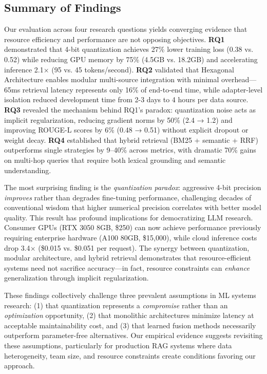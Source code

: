 \documentclass[pdflatex,sn-basic]{sn-jnl}
\begin{document}
\subsection{Summary of Findings}
\label{sec:results-summary}

Our evaluation across four research questions yields converging evidence that resource efficiency and performance are not opposing objectives. \textbf{RQ1} demonstrated that 4-bit quantization achieves 27\% lower training loss (0.38 vs. 0.52) while reducing GPU memory by 75\% (4.5GB vs. 18.2GB) and accelerating inference 2.1$\times$ (95 vs. 45 tokens/second). \textbf{RQ2} validated that Hexagonal Architecture enables modular multi-source integration with minimal overhead—65ms retrieval latency represents only 16\% of end-to-end time, while adapter-level isolation reduced development time from 2-3 days to 4 hours per data source. \textbf{RQ3} revealed the mechanism behind RQ1's paradox: quantization noise acts as implicit regularization, reducing gradient norms by 50\% (2.4 → 1.2) and improving ROUGE-L scores by 6\% (0.48 → 0.51) without explicit dropout or weight decay. \textbf{RQ4} established that hybrid retrieval (BM25 + semantic + RRF) outperforms single strategies by 9--40\% across metrics, with dramatic 70\% gains on multi-hop queries that require both lexical grounding and semantic understanding.

The most surprising finding is the \textit{quantization paradox}: aggressive 4-bit precision \textit{improves} rather than degrades fine-tuning performance, challenging decades of conventional wisdom that higher numerical precision correlates with better model quality. This result has profound implications for democratizing LLM research. Consumer GPUs (RTX 3050 8GB, \$250) can now achieve performance previously requiring enterprise hardware (A100 80GB, \$15,000), while cloud inference costs drop 3.4$\times$ (\$0.015 vs. \$0.051 per request). The synergy between quantization, modular architecture, and hybrid retrieval demonstrates that resource-efficient systems need not sacrifice accuracy—in fact, resource constraints can \textit{enhance} generalization through implicit regularization.

These findings collectively challenge three prevalent assumptions in ML systems research: (1) that quantization represents a \textit{compromise} rather than an \textit{optimization} opportunity, (2) that monolithic architectures minimize latency at acceptable maintainability cost, and (3) that learned fusion methods necessarily outperform parameter-free alternatives. Our empirical evidence suggests revisiting these assumptions, particularly for production RAG systems where data heterogeneity, team size, and resource constraints create conditions favoring our approach.
\end{document}

